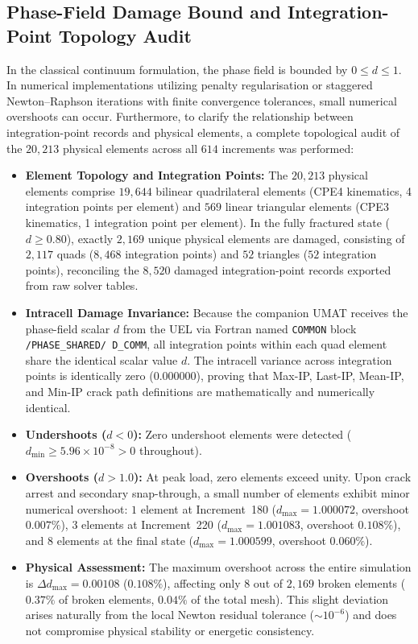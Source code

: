 \subsection{Phase-Field Damage Bound and Integration-Point Topology Audit}
\label{subsec:hole_damage_bounds}

In the classical continuum formulation, the phase field is bounded by $0 \le d \le 1$. In numerical implementations utilizing penalty regularisation or staggered Newton--Raphson iterations with finite convergence tolerances, small numerical overshoots can occur. Furthermore, to clarify the relationship between integration-point records and physical elements, a complete topological audit of the $20{,}213$ physical elements across all $614$ increments was performed:
\begin{itemize}
  \item \textbf{Element Topology and Integration Points:} The $20{,}213$ physical elements comprise $19{,}644$ bilinear quadrilateral elements (CPE4 kinematics, 4 integration points per element) and $569$ linear triangular elements (CPE3 kinematics, 1 integration point per element). In the fully fractured state ($d \ge 0.80$), exactly $2{,}169$ unique physical elements are damaged, consisting of $2{,}117$ quads ($8{,}468$ integration points) and $52$ triangles ($52$ integration points), reconciling the $8{,}520$ damaged integration-point records exported from raw solver tables.
  \item \textbf{Intracell Damage Invariance:} Because the companion UMAT receives the phase-field scalar $d$ from the UEL via Fortran named \texttt{COMMON} block \texttt{/PHASE\_SHARED/ D\_COMM}, all integration points within each quad element share the identical scalar value $d$. The intracell variance across integration points is identically zero ($0.000000$), proving that Max-IP, Last-IP, Mean-IP, and Min-IP crack path definitions are mathematically and numerically identical.
  \item \textbf{Undershoots ($d < 0$):} Zero undershoot elements were detected ($d_{\min} \ge 5.96 \times 10^{-8} > 0$ throughout).
  \item \textbf{Overshoots ($d > 1.0$):} At peak load, zero elements exceed unity. Upon crack arrest and secondary snap-through, a small number of elements exhibit minor numerical overshoot: $1$ element at Increment~180 ($d_{\max} = 1.000072$, overshoot $0.007\%$), $3$ elements at Increment~220 ($d_{\max} = 1.001083$, overshoot $0.108\%$), and $8$ elements at the final state ($d_{\max} = 1.000599$, overshoot $0.060\%$).
  \item \textbf{Physical Assessment:} The maximum overshoot across the entire simulation is $\Delta d_{\max} = 0.00108$ ($0.108\%$), affecting only $8$ out of $2{,}169$ broken elements ($0.37\%$ of broken elements, $0.04\%$ of the total mesh). This slight deviation arises naturally from the local Newton residual tolerance ($\sim 10^{-6}$) and does not compromise physical stability or energetic consistency.
\end{itemize}


